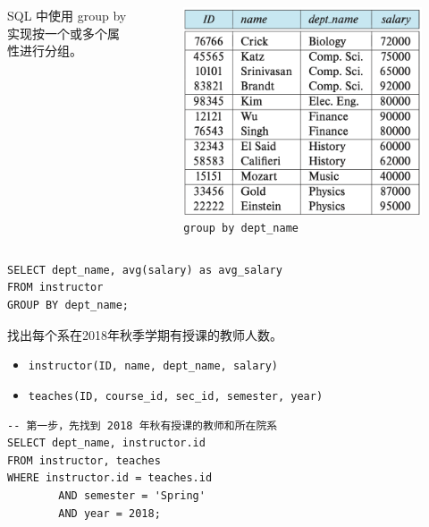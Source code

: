 \documentclass[aspectratio=169, 14pt]{beamer}
\begin{document}
\begin{frame}[fragile]
\begin{columns}
    SQL 中使用 \alert{group by} 实现按一个或多个属性进行分组。  
    \begin{figure}
        \includegraphics[width=\textwidth]{week5/group-salary}
        \caption*{\texttt{group by dept\_name}}
    \end{figure}
\end{columns}
\begin{verbatim}
SELECT dept_name, avg(salary) as avg_salary
FROM instructor
GROUP BY dept_name;
\end{verbatim}  
\end{frame}

\begin{frame}[fragile]

找出每个系在2018年秋季学期有授课的教师人数。

\begin{itemize}
    \item \texttt{instructor(ID, name, dept\_name, salary)}
    \item \texttt{teaches(ID, course\_id, sec\_id, semester, year)}
\end{itemize}



\begin{verbatim}
-- 第一步，先找到 2018 年秋有授课的教师和所在院系
SELECT dept_name, instructor.id
FROM instructor, teaches
WHERE instructor.id = teaches.id 
        AND semester = 'Spring' 
        AND year = 2018;
\end{verbatim}


\end{frame}
\end{document}

